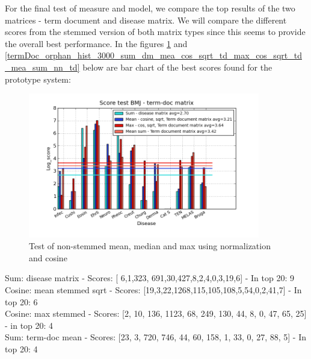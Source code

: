 For the final test of measure and model, we compare the top results of the two matrices - term document and disease matrix. We will compare the different scores from the stemmed version of both matrix types since this seems to provide the overall best performance. In the figures \ref{termDoc_bmj_hist_3000_sum_dm_mea_cos_sqrt_td_max_cos_sqrt_td_mea_sum_td} and \ref{termDoc_orphan_hist_3000_sum_dm_mea_cos_sqrt_td_max_cos_sqrt_td_mea_sum_nn_td} below are bar chart of the best scores found for the prototype system:

\begin{figure}[h!]
        \begin{center}
          \includegraphics[width=0.9\textwidth]{barcharts/termDoc_bmj_hist_3000_sum_dm_mea_cos_sqrt_td_max_cos_sqrt_td_mea_sum_td.png}
        \end{center}
        \caption{Test of non-stemmed mean, median and max using normalization and cosine}
        \label{termDoc_bmj_hist_3000_sum_dm_mea_cos_sqrt_td_max_cos_sqrt_td_mea_sum_td}
\end{figure}
 
Sum: disease matrix - Scores: [ 6,1,323, 691,30,427,8,2,4,0,3,19,6] - In top 20: 9 \\
Cosine: mean stemmed sqrt - Scores: [19,3,22,1268,115,105,108,5,54,0,2,41,7] - In top 20: 6 \\
Cosine: max stemmed - Scores: [2, 10, 136, 1123, 68, 249, 130, 44, 8, 0, 47, 65, 25] - in top 20: 4 \\
Sum: term-doc mean - Scores: [23, 3, 720, 746, 44, 60, 158, 1, 33, 0, 27, 88, 5] - In top 20: 4

